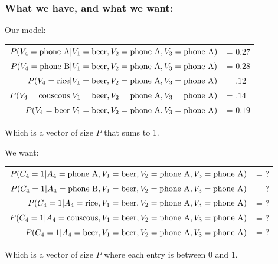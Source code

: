  \begin{frame}
  \frametitle{What we have, and what we want:}

Our model:
  \begin{tabular}{r l}
    $P(V_4={\rm phone ~ A} |V_1 = {\rm beer}, V_2 = {\rm phone ~ A}, V_3 = {\rm phone ~ A} )$ &= $0.27$ \\
    $P(V_4={\rm phone ~ B} |V_1 = {\rm beer}, V_2 = {\rm phone ~ A}, V_3 = {\rm phone ~ A} )$ &= $0.28$ \\
    $P(V_4={\rm rice} |V_1 = {\rm beer}, V_2 = {\rm phone ~ A}, V_3 = {\rm phone ~ A} )$ &= $.12$ \\
    $P(V_4={\rm couscous} |V_1 = {\rm beer}, V_2 = {\rm phone ~ A}, V_3 = {\rm phone ~ A} )$ &= $.14$ \\
    $P(V_4={\rm beer} |V_1 = {\rm beer}, V_2 = {\rm phone ~ A}, V_3 = {\rm phone ~ A} )$ &= $0.19$ \\
  \end{tabular}

\vspace{1mm}


\pause
Which is a vector of size $P$ that sums to 1.

\vspace{2mm}

We want: \pause

\vspace{1mm}


  \begin{tabular}{r r}
    $P(C_4=1| A_4={\rm phone ~ A}, V_1 = {\rm beer}, V_2 = {\rm phone ~ A}, V_3 = {\rm phone ~ A} )$ &= $?$ \\
    $P(C_4=1| A_4={\rm phone ~ B}, V_1 = {\rm beer}, V_2 = {\rm phone ~ A}, V_3 = {\rm phone ~ A} )$ &= $?$ \\
    $P(C_4=1| A_4={\rm rice}, V_1 = {\rm beer}, V_2 = {\rm phone ~ A}, V_3 = {\rm phone ~ A} )$ &= $?$ \\
    $P(C_4=1| A_4={\rm couscous}, V_1 = {\rm beer}, V_2 = {\rm phone ~ A}, V_3 = {\rm phone ~ A} )$ &= $?$ \\
    $P(C_4=1| A_4={\rm beer}, V_1 = {\rm beer}, V_2 = {\rm phone ~ A}, V_3 = {\rm phone ~ A} )$ &= $?$ \\
  \end{tabular}

\pause
Which is a vector of size $P$ where each entry is between $0$ and $1$.    

 \end{frame}


